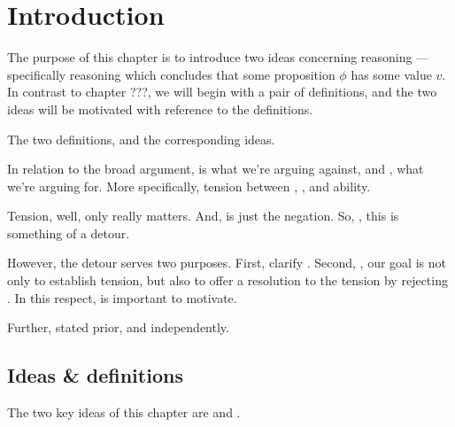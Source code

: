 \chapter{Introduction}
\label{cha:reasoning-introduction}

\begin{note}
  The purpose of this chapter is to introduce two ideas concerning reasoning --- specifically reasoning which concludes that some proposition \(\phi\) has some value \(v\).
  In contrast to {\color{red} chapter ???}, we will begin with a pair of definitions, and the two ideas will be motivated with reference to the definitions.
\end{note}

\begin{note}
  {
    \color{red}
    The two definitions, and the corresponding ideas.
  }
\end{note}

\begin{note}
  In relation to the broad argument, \ESU{} is what we're arguing against, and \EAS{}, what we're arguing for.
  More specifically, tension between \ideaCS{}, \ESU{}, and ability.
\end{note}

\begin{note}
  Tension, well, only \ESU{} really matters.
  And, \EAS{} is just the negation.
  So, \adB{}, this is something of a detour.

  However, the detour serves two purposes.
  First, clarify \ESU{}.
  Second, \EAS{}, our goal is not only to establish tension, but also to offer a resolution to the tension by rejecting \ESU{}.
  In this respect, \adB{} is important to motivate.

  Further, stated prior, and independently.
\end{note}

\section{Ideas \& definitions}
\label{sec:ideas}

\begin{note}
  The two key ideas of this chapter are \ESU{} and \EAS{}.
\end{note}

\begin{note}
  \targetESU*
\end{note}

\begin{note}
  \goalEAS*
\end{note}

